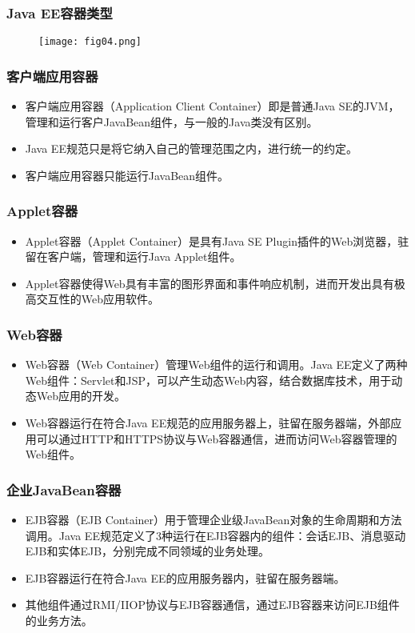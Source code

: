 \begin{frame}
\frametitle{Java EE容器类型} 
\begin{figure}
\centering
\texttt{[image: fig04.png]}
\end{figure}
\end{frame}

\begin{frame}
\frametitle{客户端应用容器} 

\begin{itemize}
\item 客户端应用容器（Application Client Container）即是普通Java SE的JVM，管理和运行客户JavaBean组件，与一般的Java类没有区别。
\item Java EE规范只是将它纳入自己的管理范围之内，进行统一的约定。
\item 客户端应用容器只能运行JavaBean组件。
\end{itemize}
\end{frame}

\begin{frame}
\frametitle{Applet容器} 
\begin{itemize}
\item Applet容器（Applet Container）是具有Java SE Plugin插件的Web浏览器，驻留在客户端，管理和运行Java Applet组件。
\item Applet容器使得Web具有丰富的图形界面和事件响应机制，进而开发出具有极高交互性的Web应用软件。
\end{itemize}
\end{frame}

\begin{frame}
\frametitle{Web容器} 
\begin{itemize}
\item Web容器（Web Container）管理Web组件的运行和调用。Java EE定义了两种Web组件：Servlet和JSP，可以产生动态Web内容，结合数据库技术，用于动态Web应用的开发。
\item Web容器运行在符合Java EE规范的应用服务器上，驻留在服务器端，外部应用可以通过HTTP和HTTPS协议与Web容器通信，进而访问Web容器管理的Web组件。
\end{itemize}
\end{frame}

\begin{frame}
\frametitle{企业JavaBean容器} 
\begin{itemize}
\item EJB容器（EJB Container）用于管理企业级JavaBean对象的生命周期和方法调用。Java EE规范定义了3种运行在EJB容器内的组件：{\hei 会话EJB、消息驱动EJB和实体EJB}，分别完成不同领域的业务处理。
\item EJB容器运行在符合Java EE的应用服务器内，驻留在服务器端。
\item 其他组件通过RMI/IIOP协议与EJB容器通信，通过EJB容器来访问EJB组件的业务方法。
\end{itemize}
\end{frame}

